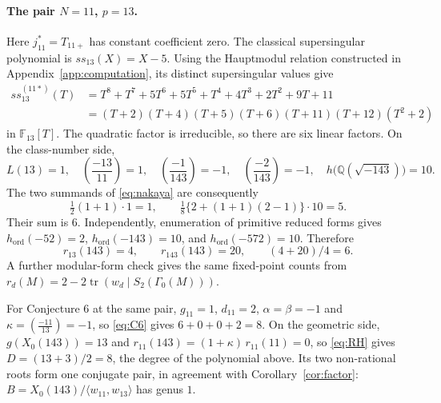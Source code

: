 \documentclass[11pt,a4paper]{article}
\theoremstyle{remark}\newtheorem{remark}[theorem]{Remark}
\numberwithin{equation}{section}
\newcommand{\Q}{\mathbb Q}\newcommand{\Z}{\mathbb Z}
\newcommand{\leg}[2]{\left(\frac{#1}{#2}\right)}
\newcommand{\ho}{h_{\mathrm{ord}}}
\newcommand{\hK}[1]{h\bigl(\Q(\sqrt{-#1})\bigr)}
\begin{document}
	\paragraph{The pair $N=11$, $p=13$.}
	Here $j_{11}^*=T_{11+}$ has constant coefficient zero. The classical supersingular polynomial is $ss_{13}(X)=X-5$. Using the Hauptmodul relation constructed in Appendix~\ref{app:computation}, its distinct supersingular values give
	\begin{align*}
		ss_{13}^{(11*)}(T)
		&=T^8+T^7+5T^6+5T^5+T^4+4T^3+2T^2+9T+11\\
		&=(T+2)(T+4)(T+5)(T+6)(T+11)(T+12)(T^2+2)
	\end{align*}
	in $\mathbb F_{13}[T]$. The quadratic factor is irreducible, so there are six linear factors. On the class-number side,
	\[
	L(13)=1,\quad \leg{-13}{11}=1,\quad
	\leg{-1}{143}=-1,\quad \leg{-2}{143}=-1,\quad \hK{143}=10.
	\]
	The two summands of \eqref{eq:nakaya} are consequently
	\[
	\tfrac12(1+1)\cdot1=1,\qquad
	\tfrac18\{2+(1+1)(2-1)\}\cdot10=5.
	\]
	Their sum is $6$. Independently, enumeration of primitive reduced forms gives $\ho(-52)=2$, $\ho(-143)=10$, and $\ho(-572)=10$. Therefore
	\[
	r_{13}(143)=4,\qquad r_{143}(143)=20,\qquad (4+20)/4=6.
	\]
	A further modular-form check gives the same fixed-point counts from $r_d(M)=2-2\operatorname{tr}(w_d\mid S_2(\Gamma_0(M)))$.
	
	For Conjecture 6 at the same pair, $g_{11}=1$, $d_{11}=2$, $\alpha=\beta=-1$ and $\kappa=\leg{-11}{13}=-1$, so \eqref{eq:C6} gives $6+0+0+2=8$. On the geometric side, $g(X_0(143))=13$ and $r_{11}(143)=(1+\kappa)\,r_{11}(11)=0$, so \eqref{eq:RH} gives $D=(13+3)/2=8$, the degree of the polynomial above. Its two non-rational roots form one conjugate pair, in agreement with Corollary~\ref{cor:factor}: $B=X_0(143)/\langle w_{11},w_{13}\rangle$ has genus $1$.
	
\end{document}
